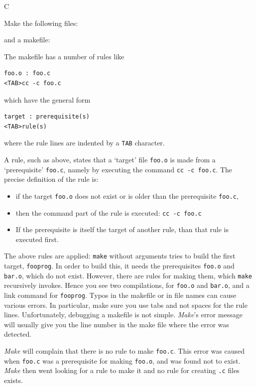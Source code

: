  {C}

Make the following files:

and a makefile:

The makefile has a number of rules like
\begin{lstlisting}
foo.o : foo.c
<TAB>cc -c foo.c
\end{lstlisting}
which have the general form
\begin{lstlisting}
target : prerequisite(s)
<TAB>rule(s)
\end{lstlisting}
where the rule lines are indented by a \lstinline{TAB} character.

A rule, such as above, states that a `target' file \lstinline{foo.o} is made
from a `prerequisite' \lstinline{foo.c}, namely by executing the command
\lstinline{cc -c foo.c}. The precise definition of the rule is:
\begin{itemize}
\item if the target \lstinline{foo.o} does not exist or is older than the
  prerequisite \lstinline{foo.c},
\item then the command part of the rule is executed: \lstinline{cc -c foo.c}
\item If the prerequisite is itself the target of another rule, than that
  rule is executed first.
\end{itemize}

  {The above rules are applied: \lstinline{make} without arguments tries to
    build the first target, \lstinline{fooprog}. In order to build this, it
    needs the prerequisites \lstinline{foo.o} and \lstinline{bar.o}, which do not
    exist. However, there are rules for making them, which \lstinline{make}
    recursively invokes. Hence you see two compilations, for \lstinline{foo.o}
    and \lstinline{bar.o}, and a link command for \lstinline{fooprog}.}
  {Typos in the makefile or in file names can cause various
    errors. In particular, make sure you use tabs and not spaces for
    the rule lines. Unfortunately, debugging a makefile is not simple. 
    \emph{Make}'s error message will usually give 
    you the line number in the make file where the error was detected.}

  {\emph{Make} will complain that there is no rule to make
    \lstinline{foo.c}. This error was caused when \lstinline{foo.c} was a
    prerequisite for making \lstinline{foo.o}, and was found not to exist. 
    \emph{Make} then went
    looking for a rule to make it and no rule for creating \lstinline{.c}
    files exists.}{}

